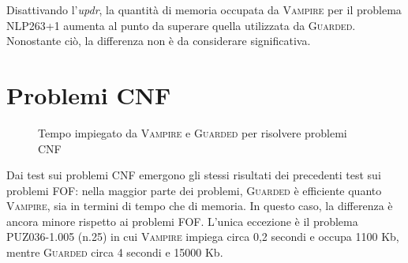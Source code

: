 Disattivando l'\emph{updr}, la quantità di memoria occupata da \textsc{Vampire} per il problema NLP263+1 aumenta al punto 
da superare quella utilizzata da \textsc{Guarded}. Nonostante ciò, la differenza non è da considerare significativa.

\section{Problemi CNF}
\begin{figure}[H]
    \caption{Tempo impiegato da \textsc{Vampire} e \textsc{Guarded} per risolvere problemi CNF}
\end{figure}


Dai test sui problemi CNF emergono gli stessi risultati dei precedenti test sui problemi FOF: nella maggior parte dei problemi, \textsc{Guarded} è efficiente
quanto \textsc{Vampire}, sia in termini di tempo che di memoria. In questo caso, la differenza è ancora minore rispetto ai problemi FOF.
L'unica eccezione è il problema PUZ036-1.005 (n.25) in cui \textsc{Vampire} impiega circa 0,2 secondi e occupa 1100 Kb, mentre \textsc{Guarded}
circa 4 secondi e 15000 Kb.

